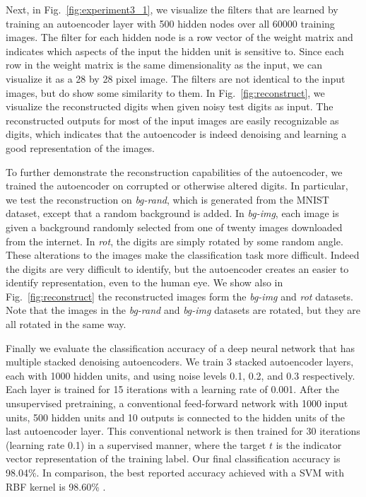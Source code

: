 Next, in Fig.~\ref{fig:experiment3_1}, we visualize the filters that are
learned by training an autoencoder layer with 500 hidden nodes over all 60000
training images. The  filter for each hidden node is a row vector of the weight
matrix and indicates which aspects of the input the hidden unit is sensitive
to. Since each row in the weight matrix is the same dimensionality as the
input, we can visualize it as a 28 by 28 pixel image. The filters are not
identical to the input images, but do show some similarity to them. In
Fig.~\ref{fig:reconstruct}, we visualize the reconstructed digits when given
noisy test digits as input. The reconstructed outputs for most of the input
images are easily recognizable as digits, which indicates that the autoencoder
is indeed denoising and learning a good representation of the images.

To further demonstrate the reconstruction capabilities of the autoencoder, we
trained the autoencoder on corrupted or otherwise altered digits.  In
particular, we test the reconstruction on \textit{bg-rand}, which is generated
from the MNIST dataset, except that a random background is added. In
\textit{bg-img}, each image is given a background randomly selected from one of
twenty images downloaded from the internet. In \textit{rot}, the digits are
simply rotated by some random angle.  These alterations to the images make the
classification task more difficult. Indeed the digits are very difficult to
identify, but the autoencoder creates an easier to identify representation,
even to the human eye. We show also in Fig.~\ref{fig:reconstruct} the
reconstructed images form the \textit{bg-img} and \textit{rot} datasets. Note
that the images in the \textit{bg-rand} and \textit{bg-img} datasets are
rotated, but they are all rotated in the same way.

Finally we evaluate the classification accuracy of a deep neural network that
has multiple stacked denoising autoencoders. We train 3 stacked autoencoder
layers, each with 1000 hidden units, and using noise levels 0.1, 0.2, and 0.3
respectively. Each layer is trained for 15 iterations with a learning rate of
0.001. After the unsupervised pretraining, a conventional feed-forward network
with 1000 input units, 500 hidden units and 10 outputs is connected to the
hidden units of the last autoencoder layer. This conventional network is then
trained for 30 iterations (learning rate 0.1) in a supervised manner, where the
target $t$ is the indicator vector representation of the training label. Our
final classification accuracy is 98.04\%. In comparison, the best reported accuracy achieved
with a SVM with RBF kernel is 98.60\% \cite{vincent2010stacked}.

